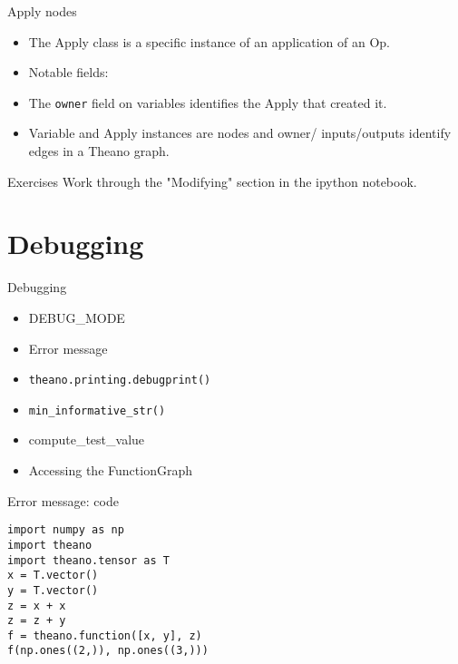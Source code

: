 \documentclass[utf8x,hyperref={pdfpagelabels=false}]{beamer}
\newcommand{\code}[1]{\lstinline[emph={[2]}]|#1|}
\begin{document}
\begin{frame}{Apply nodes}
  \begin{itemize}
  \item The Apply class is a specific instance of an application of an Op.
  \item Notable fields:
  \item The \code{owner} field on variables identifies the Apply that created it.
  \item Variable and Apply instances are nodes and owner/
    inputs/outputs identify edges in a Theano graph.
  \end{itemize}
\end{frame}

\begin{frame}{Exercises}
Work through the "Modifying" section in the ipython notebook.
\end{frame}

\section{Debugging}
\begin{frame}{Debugging}
  \begin{itemize}
  \item DEBUG\_MODE
  \item Error message
  \item \code{theano.printing.debugprint()}
  \item \code{min_informative_str()}
  \item compute\_test\_value
  \item Accessing the FunctionGraph
  \end{itemize}
\end{frame}

\begin{frame}[fragile]{Error message: code}
\begin{lstlisting}
import numpy as np
import theano
import theano.tensor as T
x = T.vector()
y = T.vector()
z = x + x
z = z + y
f = theano.function([x, y], z)
f(np.ones((2,)), np.ones((3,)))
\end{lstlisting}
\end{frame}
\end{document}

